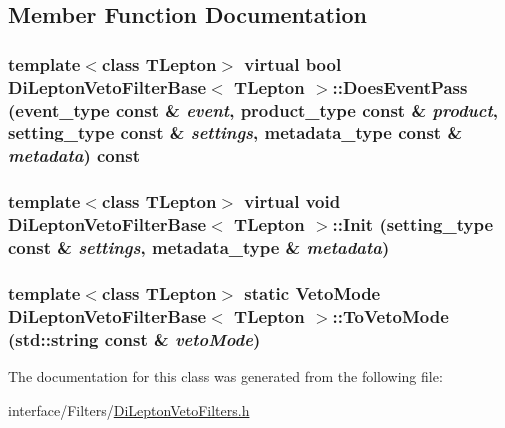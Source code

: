 \subsection{Member Function Documentation}
\hypertarget{classDiLeptonVetoFilterBase_a762d65d117fba9ecc691e4ade7bca8a3}{
\subsubsection[{DoesEventPass}]{\setlength{\rightskip}{0pt plus 5cm}template$<$class TLepton$>$ virtual bool {\bf DiLeptonVetoFilterBase}$<$ TLepton $>$::DoesEventPass (event\_\-type const \& {\em event}, \/  product\_\-type const \& {\em product}, \/  setting\_\-type const \& {\em settings}, \/  metadata\_\-type const \& {\em metadata}) const}}
\label{classDiLeptonVetoFilterBase_a762d65d117fba9ecc691e4ade7bca8a3}
\hypertarget{classDiLeptonVetoFilterBase_a6a332de68628eb7626a66d529930493e}{
\subsubsection[{Init}]{\setlength{\rightskip}{0pt plus 5cm}template$<$class TLepton$>$ virtual void {\bf DiLeptonVetoFilterBase}$<$ TLepton $>$::Init (setting\_\-type const \& {\em settings}, \/  metadata\_\-type \& {\em metadata})}}
\label{classDiLeptonVetoFilterBase_a6a332de68628eb7626a66d529930493e}
\hypertarget{classDiLeptonVetoFilterBase_a9e4842d8a50e4bb01838013c43d8dd17}{
\subsubsection[{ToVetoMode}]{\setlength{\rightskip}{0pt plus 5cm}template$<$class TLepton$>$ static {\bf VetoMode} {\bf DiLeptonVetoFilterBase}$<$ TLepton $>$::ToVetoMode (std::string const \& {\em vetoMode})}}
\label{classDiLeptonVetoFilterBase_a9e4842d8a50e4bb01838013c43d8dd17}


The documentation for this class was generated from the following file:\begin{DoxyCompactItemize}
\item 
interface/Filters/\hyperlink{DiLeptonVetoFilters_8h}{DiLeptonVetoFilters.h}\end{DoxyCompactItemize}
